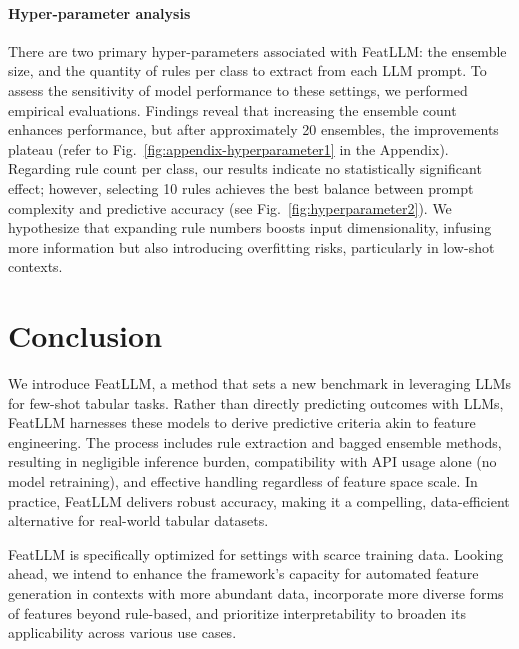 \vspace*{-0.12in}
\paragraph{Hyper-parameter analysis}
There are two primary hyper-parameters associated with \textsf{FeatLLM}: the ensemble size, and the quantity of rules per class to extract from each LLM prompt. To assess the sensitivity of model performance to these settings, we performed empirical evaluations. Findings reveal that increasing the ensemble count enhances performance, but after approximately 20 ensembles, the improvements plateau (refer to Fig.~\ref{fig:appendix-hyperparameter1} in the Appendix). Regarding rule count per class, our results indicate no statistically significant effect; however, selecting 10 rules achieves the best balance between prompt complexity and predictive accuracy (see Fig.~\ref{fig:hyperparameter2}). We hypothesize that expanding rule numbers boosts input dimensionality, infusing more information but also introducing overfitting risks, particularly in low-shot contexts.

\section{Conclusion}
We introduce \textsf{FeatLLM}, a method that sets a new benchmark in leveraging LLMs for few-shot tabular tasks. Rather than directly predicting outcomes with LLMs, \textsf{FeatLLM} harnesses these models to derive predictive criteria akin to feature engineering. The process includes rule extraction and bagged ensemble methods, resulting in negligible inference burden, compatibility with API usage alone (no model retraining), and effective handling regardless of feature space scale. In practice, \textsf{FeatLLM} delivers robust accuracy, making it a compelling, data-efficient alternative for real-world tabular datasets.

\textsf{FeatLLM} is specifically optimized for settings with scarce training data. Looking ahead, we intend to enhance the framework’s capacity for automated feature generation in contexts with more abundant data, incorporate more diverse forms of features beyond rule-based, and prioritize interpretability to broaden its applicability across various use cases.

